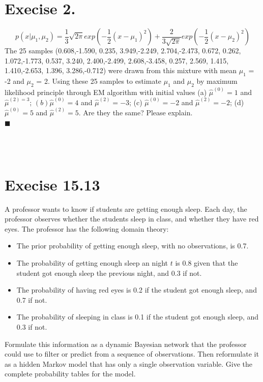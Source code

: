 \documentclass{article}
\newcommand{\solution}[1]{~\\ $\blacksquare$ \sffamily\upshape\selectfont #1
\normalfont ~\\~ }
\begin{document}
\section{Execise 2.}
\[ p(x|\mu_1,\mu_2)=\frac{1}{3}\sqrt{2\pi}exp(-\frac{1}{2}(x-\mu_1)^2) +
\frac{2}{3\sqrt{2\pi}}exp(-\frac{1}{2}(x-\mu_2)^2) \]
The 25 samples (0.608,-1.590, 0.235, 3.949,-2.249, 2.704,-2.473,
0.672, 0.262, 1.072,-1.773, 0.537, 3.240, 2.400,-2.499, 2.608,-3.458,
0.257, 2.569, 1.415, 1.410,-2.653, 1.396, 3.286,-0.712) were drawn
from this mixture with mean $\mu_1$ = -2 and $\mu_2$ = 2. Using these
25 samples to estimate $\mu_1$ and $\mu_2$ by maximum likelihood
principle through EM algorithm with initial values (a)
$\hat{\mu}^{(0)} = 1$ and $\hat{\mu}^{(2)=3}$; $(b)\hat{\mu}^{(0)} =
4$ and $\hat{\mu}^{(2)} = -3$; (c) $\hat{\mu}^{(0)} = -2$ and
$\hat{\mu}^{(2)} = -2$; (d) $\hat{\mu}^{(0)} = 5$ and $\hat{\mu}^{(2)}
= 5$. Are they the same? Please explain.
\solution{

}
\section{Execise 15.13}
A professor wants to know if students are getting enough sleep. Each
day, the professor observes whether the students sleep in class, and
whether they have red eyes. The professor has the following domain
theory:
\begin{itemize}
\item The prior probability of getting enough sleep, with no
  observations, is 0.7.
\item The probability of getting enough sleep an night $t$ is 0.8 given
  that the student got enough sleep the previous night, and 0.3 if not. 
\item The probability of having red eyes is 0.2 if the student got
  enough sleep, and 0.7 if not. 
\item The probability of sleeping in class is 0.1 if the student got
  enough sleep, and 0.3 if not. 
\end{itemize}
Formulate this information as a dynamic Bayesian network that the
professor could use to filter or predict from a sequence of
observations. Then reformulate it as a hidden Markov model that has
only a single observation variable. Give the complete probability
tables for the model.
\end{document}
